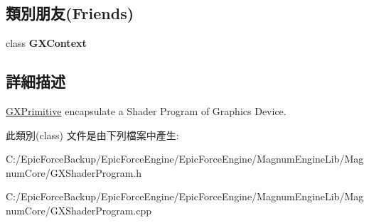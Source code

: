 \subsection*{類別朋友(Friends)}
\begin{DoxyCompactItemize}
\item 
class {\bfseries G\+X\+Context}\hypertarget{class_magnum_1_1_g_x_shader_program_a2c36d7f8865080802bbad88cd73d871c}{}\label{class_magnum_1_1_g_x_shader_program_a2c36d7f8865080802bbad88cd73d871c}

\end{DoxyCompactItemize}


\subsection{詳細描述}
\hyperlink{class_magnum_1_1_g_x_primitive}{G\+X\+Primitive} encapsulate a Shader Program of Graphics Device. 

此類別(class) 文件是由下列檔案中產生\+:\begin{DoxyCompactItemize}
\item 
C\+:/\+Epic\+Force\+Backup/\+Epic\+Force\+Engine/\+Epic\+Force\+Engine/\+Magnum\+Engine\+Lib/\+Magnum\+Core/G\+X\+Shader\+Program.\+h\item 
C\+:/\+Epic\+Force\+Backup/\+Epic\+Force\+Engine/\+Epic\+Force\+Engine/\+Magnum\+Engine\+Lib/\+Magnum\+Core/G\+X\+Shader\+Program.\+cpp\end{DoxyCompactItemize}
